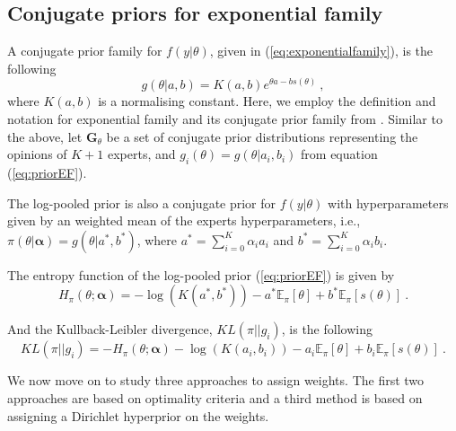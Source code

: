 \documentclass[a4paper, notitlepage, 10pt]{article}
\begin{document}
\subsection{Conjugate priors for exponential family}
\label{sec:conjugexpofamily}

A conjugate prior family for $f(y|\theta)$, given in (\ref{eq:exponentialfamily}), is the following
\begin{equation}
\label{eq:priorEF}
g(\theta | a, b) = K(a,b) e^{\theta a - b s(\theta)} \: ,
\end{equation}
where $K(a,b)$ is a normalising constant.
Here, we employ the definition and notation for exponential family and its conjugate prior family from \citet[chapter 3]{robert2001}. %
Similar to the above, let $\mathbf{G}_{\theta}$ be a set of conjugate prior distributions representing the opinions of $K+1$ experts, and $g_i(\theta) = g(\theta | a_i, b_i)$ from equation (\ref{eq:priorEF}).

The log-pooled prior is also a conjugate prior for $f(y|\theta)$ with hyperparameters given by an weighted mean of the experts hyperparameters, i.e., $\pi(\theta|\boldsymbol\alpha) = g(\theta | a^*, b^* )$, where $a^* = \sum_{i=0}^K \alpha_i a_i$ and $b^* = \sum_{i=0}^K \alpha_i b_i$.

The entropy function of the log-pooled prior (\ref{eq:priorEF}) is given by
\begin{equation}
\label{eq:entropypriorEF}
H_\pi(\theta; \boldsymbol\alpha) = - \log (K(a^*, b^*))  -  a^*  \mathbb{E}_\pi[\theta]  +  b^*  \mathbb{E}_\pi[s(\theta)] \: .
\end{equation}

And the Kullback-Leibler divergence, $KL(\pi || g_i )$, is the following
\begin{equation}
\label{eq:KLpriorEF}
KL( \pi || g_i ) = - H_\pi(\theta; \boldsymbol\alpha) - \log( K(a_i,b_i)) - a_i \mathbb{E}_\pi[\theta] + b_i \mathbb{E}_\pi[s(\theta)] \: .
\end{equation}

We now move on to study three approaches to assign weights.
The first two approaches are based on optimality criteria and a third method is based on assigning a Dirichlet hyperprior on the weights.
\end{document}
